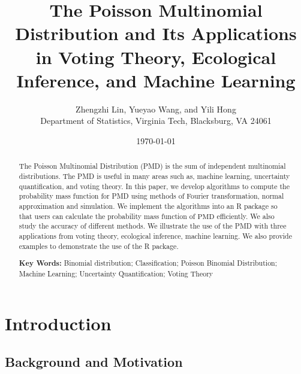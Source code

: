 \documentclass[12pt]{article}
\newcommand{\PMD}{\textrm{PMD}}
\begin{document}


\title{The Poisson Multinomial Distribution and Its Applications in Voting Theory, Ecological Inference, and Machine Learning}


\author{
Zhengzhi Lin, Yueyao Wang, and Yili Hong\\[1.5ex]
{Department of Statistics, Virginia Tech, Blacksburg, VA 24061}
}
	
\date{\today}
	
\maketitle
\begin{abstract}
The Poisson Multinomial Distribution (PMD) is the sum of independent multinomial distributions. The PMD is useful in many areas such as, machine learning, uncertainty quantification, and voting theory. In this paper, we develop algorithms to compute the probability mass function for PMD using methods of Fourier transformation, normal approximation and simulation. We implement the algorithms into an R package so that users can calculate the probability mass function of $\PMD$ efficiently. We also study the accuracy of different methods. We illustrate the use of the PMD with three applications from voting theory, ecological inference, machine learning. We also provide examples to demonstrate the use of the R package.
		
\textbf{Key Words:} Binomial distribution; Classification; Poisson Binomial Distribution; Machine Learning; Uncertainty Quantification;  Voting Theory
\end{abstract}
	
\newpage
	
\section{Introduction}
\subsection{Background and Motivation}
\end{document}
